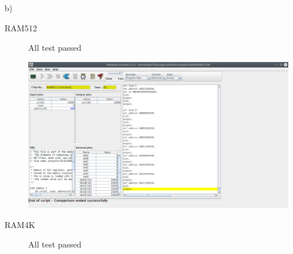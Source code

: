 \documentclass[titlepage]{article}
\begin{document}
\begin{enumerate}
{
  }
  \item[b)]{
    \begin{description}
      \item[RAM512]{
        All test passed

        \includegraphics[width=.9\textwidth]{b/RAM512.png}
      }
      \item[RAM4K]{
        All test passed

}
\end{description}}
\end{enumerate}
\end{document}
